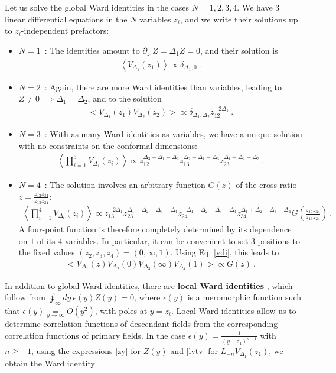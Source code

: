\documentclass[12pt, a4paper]{article}
\newcommand{\myindex}[1]{\textbf{\boldmath #1}}
\theoremstyle{break}
\begin{document}
Let us solve the global Ward identities in the cases $N=1,2,3,4$. We have $3$ linear differential equations in the $N$ variables $z_i$, and we write their solutions up to $z_i$-independent prefactors:
\begin{itemize}
 \item $\boxed{N=1}$\ : The identities amount to $\partial_{z_1} Z = \Delta_1 Z=0$, and their solution is 
 \begin{align}
  \left<V_{\Delta_1}(z_1)\right>\propto \delta_{\Delta_1,0}\ . 
 \end{align}
 \item $\boxed{N=2}$\ : Again, there are more Ward identities than variables, leading to $Z\neq 0\implies \Delta_1=\Delta_2$, and to the solution
 \begin{align}
 \Big< V_{\Delta_1}(z_1)V_{\Delta_2}(z_2) \Big> \propto \delta_{\Delta_1,\Delta_2} z_{12}^{-2\Delta_1} \ .
 \label{2pt}
\end{align}
\item $\boxed{N=3}$\ : With as many Ward identities as variables, we have a unique solution with no constraints on the conformal dimensions:
\begin{align}
 \left< \prod_{i=1}^3 V_{\Delta_i}(z_i) \right> \propto z_{12}^{\Delta_3-\Delta_1-\Delta_2} z_{13}^{\Delta_2-\Delta_1-\Delta_3} z_{23}^{\Delta_1-\Delta_2-\Delta_3}\ .
 \label{3pt}
\end{align}
\item $\boxed{N=4}$\ : The solution involves an arbitrary function $G(z)$ of the cross-ratio $z=\frac{z_{12}z_{34}}{z_{13}z_{24}}$:
\begin{align}
 \left< \prod_{i=1}^4 V_{\Delta_i}(z_i) \right> 
 \propto z_{13}^{-2\Delta_1} z_{23}^{\Delta_1-\Delta_2-\Delta_3+\Delta_4} z_{24}^{-\Delta_1-\Delta_2+\Delta_3-\Delta_4} z_{34}^{\Delta_1+\Delta_2-\Delta_3-\Delta_4} G\left(\frac{z_{12}z_{34}}{z_{13}z_{24}}\right)\ .
 \label{4pt}
\end{align}
A four-point function is therefore completely determined by its dependence on $1$ of its $4$ variables. In particular, it can be convenient to set $3$ positions to the fixed values $(z_2,z_3,z_4)=(0,\infty,1)$. Using Eq. \eqref{vdi}, this leads to 
\begin{align}
 \Big< V_{\Delta_1}(z) V_{\Delta_2}(0)V_{\Delta_3}(\infty)V_{\Delta_4}(1) \Big> \propto G(z)\ . 
\end{align}
\end{itemize}
In addition to global Ward identities, there are \myindex{local Ward identities} , which follow from $\oint_\infty dy\ \epsilon(y)Z(y)=0$, where $\epsilon(y)$ is a meromorphic function such that $\epsilon(y)\underset{y\to\infty}{=}O(y^2)$, with poles at $y=z_i$. Local Ward identities allow us to determine correlation functions of descendant fields from the corresponding correlation functions of primary fields. In the case $\epsilon(y) = \frac{1}{(y-z_1)^{n-1}}$ with $n\geq -1$, using the expressions \eqref{zy} for $Z(y)$ and \eqref{lvtv} for $L_{-n}V_{\Delta_1}(z_1)$, we obtain the Ward identity
\end{document}
